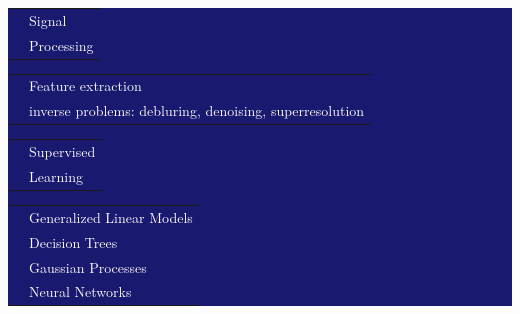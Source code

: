 \documentclass[letterpaper]{article}
\begin{document}
\begin{minipage}{1.\linewidth}
\colorbox{MidnightBlue}{
\begin{minipage}{0.47\linewidth} %
	\begin{minipage}{1\linewidth}
		\vspace{2ex}
	\end{minipage}
	\begin{minipage}{1\linewidth} %
		\begin{minipage}{0.47\linewidth}
			\begin{tabularx}{1\textwidth}{rX}
				& \Large\textmd{\textcolor{white}{Signal}}\\
				& \Large\textmd{\textcolor{white}{Processing}}\\
			\end{tabularx}
			\vspace{1ex}
			\begin{minipage}{1\linewidth}
				\small\textcolor{white}{
				\begin{tabularx}{1\textwidth}{cX}
					& Feature extraction \\
					& inverse problems: debluring, denoising, superresolution\\
				\end{tabularx}
				} 
			\end{minipage}
			\vspace{2ex}
		\end{minipage}
		\hfill
		\begin{minipage}{0.47\linewidth}
			\begin{tabularx}{1\textwidth}{rX}
				& \Large\textmd{\textcolor{white}{Supervised}}\\
				& \Large\textmd{\textcolor{white}{Learning}}\\
			\end{tabularx}
			\vspace{1ex}
			\begin{minipage}{1\linewidth}
				\small\textcolor{white}{
				\begin{tabularx}{1\textwidth}{cX}
					& Generalized Linear Models\\
					& Decision Trees\\
					& Gaussian Processes\\
					& Neural Networks\\
				\end{tabularx}
}
\end{minipage}
\end{minipage}
\end{minipage}
\end{minipage}}
\end{minipage}
\end{document}
